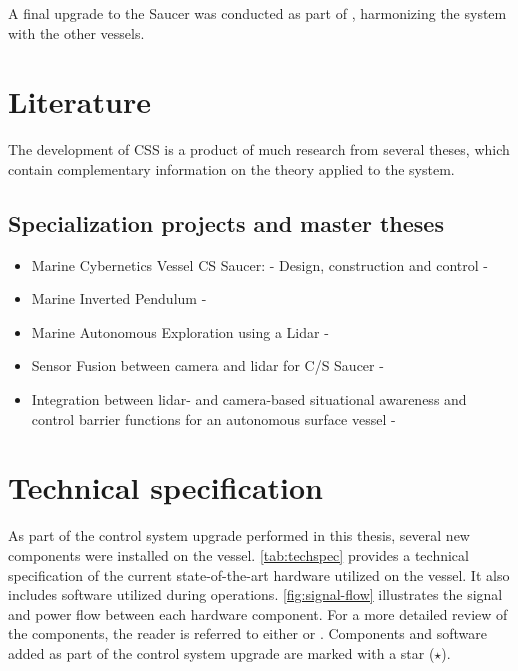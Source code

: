 A final upgrade to the Saucer was conducted as part of \citet{solheim-master}, harmonizing the system with the other vessels. 

\section{Literature}

The development of CSS is a product of much research from several theses, which contain complementary information on the theory applied to the system.

\subsection{Specialization projects and master theses}

\begin{itemize}
    \item Marine Cybernetics Vessel CS Saucer: - Design, construction and control - \citet{idland2015marine}
    \item Marine Inverted Pendulum - \citet{sharoni2016marine}
    \item Marine Autonomous Exploration using a Lidar - \citet{ueland}
    \item Sensor Fusion between camera and lidar for C/S Saucer - \citet{solheim}
    \item Integration between lidar- and camera-based situational awareness and control barrier functions for an autonomous surface vessel - \citet{solheim-master}
\end{itemize}

\section{Technical specification}

As part of the control system upgrade performed in this thesis, several new components were installed on the vessel. \cref{tab:techspec} provides a technical specification of the current state-of-the-art hardware utilized on the vessel. It also includes software utilized during operations. \cref{fig:signal-flow} illustrates the signal and power flow between each hardware component. For a more detailed review of the components, the reader is referred to either \citet{solheim} or \citet{ueland}. Components and software added as part of the control system upgrade are marked with a star ($\star$).

